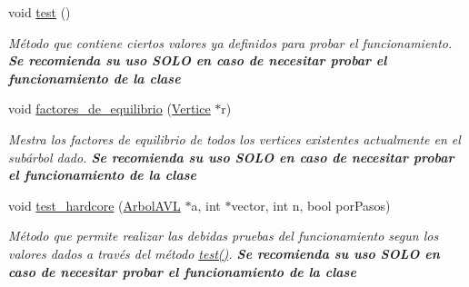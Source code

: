 \begin{DoxyCompactItemize}
void \hyperlink{classArbolAVL_a783a3ffe994d8c2b4069d2fd45afab7f}{test} ()
\begin{DoxyCompactList}\small\item\em Método que contiene ciertos valores ya definidos para probar el funcionamiento. {\bfseries Se recomienda su uso S\+O\+LO en caso de necesitar probar el funcionamiento de la clase} \end{DoxyCompactList}\item 
void \hyperlink{classArbolAVL_ae6341a610967afe9a45c6fcddb68c4c9}{factores\+\_\+de\+\_\+equilibrio} (\hyperlink{classVertice}{Vertice} $\ast$r)
\begin{DoxyCompactList}\small\item\em Mestra los factores de equilibrio de todos los vertices existentes actualmente en el subárbol dado. {\bfseries Se recomienda su uso S\+O\+LO en caso de necesitar probar el funcionamiento de la clase} \end{DoxyCompactList}\item 
void \hyperlink{classArbolAVL_aeb90eb1614513b7438f98a43766d573d}{test\+\_\+hardcore} (\hyperlink{classArbolAVL}{Arbol\+A\+VL} $\ast$a, int $\ast$vector, int n, bool por\+Pasos)
\begin{DoxyCompactList}\small\item\em Método que permite realizar las debidas pruebas del funcionamiento segun los valores dados a través del método \hyperlink{classArbolAVL_a783a3ffe994d8c2b4069d2fd45afab7f}{test()}. {\bfseries Se recomienda su uso S\+O\+LO en caso de necesitar probar el funcionamiento de la clase} \end{DoxyCompactList}\end{DoxyCompactItemize}
